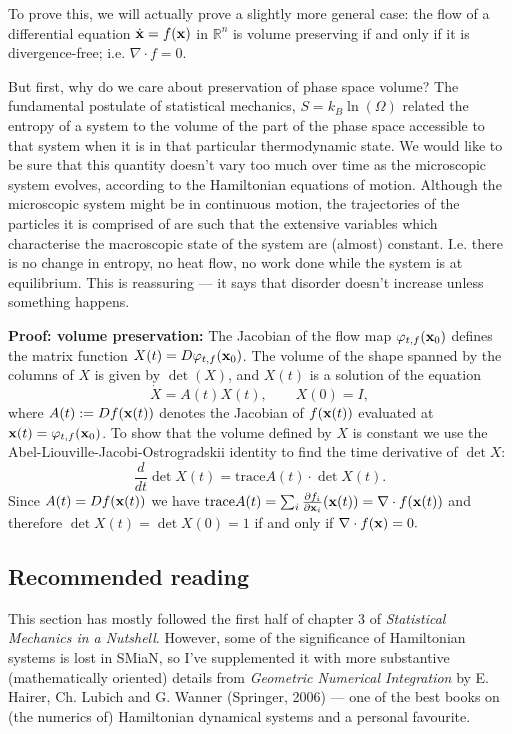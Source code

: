 To prove this, we will actually prove a slightly more general case: the flow of a differential equation $\dot{\bf x}=f({\bf x})$ in $\mathbb{R}^n$ is volume preserving if and only if it is divergence-free; i.e. $\nabla\cdot f=0$.

But first, why do we care about preservation of phase space volume? The fundamental postulate of statistical mechanics, $S=k_B\ln(\Omega)$ related the entropy of a system to the volume of the part of the phase space accessible to that system when it is in that particular thermodynamic state. We would like to be sure that this quantity doesn't vary too much over time as the microscopic system evolves, according to the Hamiltonian equations of motion. Although the microscopic system might be in continuous motion, the trajectories of the particles it is comprised of are such that the extensive variables which characterise the macroscopic state of the system are (almost) constant. I.e. there is no change in entropy, no heat flow, no work done while the system is at equilibrium. This is reassuring --- it says that disorder doesn't increase unless something happens.

{\bf Proof: volume preservation:}
The Jacobian of the flow map $\varphi_{t,f}({\bf x}_0)$ defines the matrix function $X(t)=D\varphi_{t,f}({\bf x}_0)$. The volume of the shape spanned by the columns of $X$ is given by $\det(X)$, and $X(t)$ is a solution of the equation
$$
\dot{X}=A(t)X(t),\qquad X(0)=I,
$$
where $A(t):=Df({\bf x}(t))$ denotes the Jacobian of $f({\bf x}(t))$ evaluated at ${\bf x}(t)=\varphi_{t,f}({\bf x}_0)$. To show that the volume defined by $X$ is constant we use the Abel-Liouville-Jacobi-Ostrogradskii identity to find the time derivative of $\det X$:
$$
\frac{d}{dt}\det X(t)=\text{trace} A(t)\cdot\det X(t).
$$
Since $A(t)=Df({\bf x}(t))$ we have $\text{trace} A(t)=\sum_i\frac{\partial f_i}{\partial {\bf x}_i}({\bf x}(t))=\nabla\cdot f({\bf x}(t))$ and therefore $\det X(t)=\det X(0)=1$ if and only if $\nabla\cdot f({\bf x})=0.$

\subsection{Recommended reading}
This section has mostly followed the first half of chapter 3 of \emph{Statistical Mechanics in a Nutshell}. However, some of the significance of Hamiltonian systems is lost in SMiaN, so I've supplemented it with more substantive (mathematically oriented) details from \emph{Geometric Numerical Integration} by E. Hairer, Ch. Lubich and G. Wanner (Springer, 2006) --- one of the best books on (the numerics of) Hamiltonian dynamical systems and a personal favourite.
